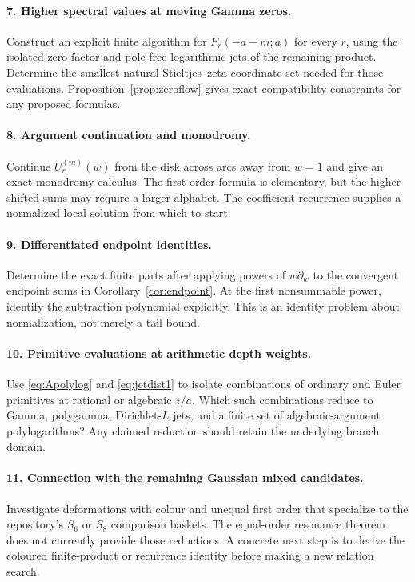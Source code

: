 \documentclass[11pt]{article}
\numberwithin{equation}{section}
\theoremstyle{definition}\newtheorem{definition}[theorem]{Definition}
\theoremstyle{remark}\newtheorem{remark}[theorem]{Remark}
\begin{document}
\paragraph{7. Higher spectral values at moving Gamma zeros.}
Construct an explicit finite algorithm for $F_r(-a-m;a)$ for every $r$,
using the isolated zero factor and pole-free logarithmic jets of the
remaining product. Determine the smallest natural Stieltjes--zeta
coordinate set needed for those evaluations. Proposition~\ref{prop:zeroflow}
gives exact compatibility constraints for any proposed formulas.

\paragraph{8. Argument continuation and monodromy.}
Continue $U_r^{(m)}(w)$ from the disk across arcs away from $w=1$ and give
an exact monodromy calculus. The first-order formula is elementary, but
the higher shifted sums may require a larger alphabet. The coefficient
recurrence supplies a normalized local solution from which to start.

\paragraph{9. Differentiated endpoint identities.}
Determine the exact finite parts after applying powers of $w\partial_w$
to the convergent endpoint sums in Corollary~\ref{cor:endpoint}. At the
first nonsummable power, identify the subtraction polynomial explicitly.
This is an identity problem about normalization, not merely a tail bound.

\paragraph{10. Primitive evaluations at arithmetic depth weights.}
Use \eqref{eq:Apolylog} and \eqref{eq:jetdist1} to isolate combinations of
ordinary and Euler primitives at rational or algebraic $z/a$. Which such
combinations reduce to Gamma, polygamma, Dirichlet-$L$ jets, and a finite
set of algebraic-argument polylogarithms? Any claimed reduction should
retain the underlying branch domain.

\paragraph{11. Connection with the remaining Gaussian mixed candidates.}
Investigate deformations with colour and unequal first order that specialize
to the repository's $S_6$ or $S_8$ comparison baskets. The equal-order
resonance theorem does not currently provide those reductions. A concrete
next step is to derive the coloured finite-product or recurrence identity
before making a new relation search.
\end{document}
